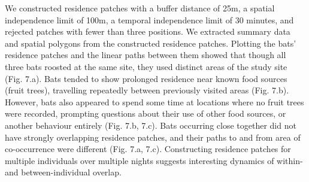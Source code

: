\documentclass[10pt,paper=a4,headings=standardclasses
]{scrartcl}
\begin{document}
We constructed residence patches with a buffer distance of 25m, a spatial independence limit of 100m, a temporal independence limit of 30 minutes, and rejected patches with fewer than three positions.
We extracted summary data and spatial polygons from the constructed residence patches.
Plotting the bats' residence patches and the linear paths between them showed that though all three bats roosted at the same site, they used distinct areas of the study site (Fig. 7.a).
Bats tended to show prolonged residence near known food sources (fruit trees), travelling repeatedly between previously visited areas (Fig. 7.b).
However, bats also appeared to spend some time at locations where no fruit trees were recorded, prompting questions about their use of other food sources, or another behaviour entirely (Fig. 7.b, 7.c).
Bats occurring close together did not have strongly overlapping residence patches, and their paths to and from area of co-occurrence were different (Fig. 7.a, 7.c).
Constructing residence patches for multiple individuals over multiple nights suggests interesting dynamics of within- and between-individual overlap.
\end{document}
